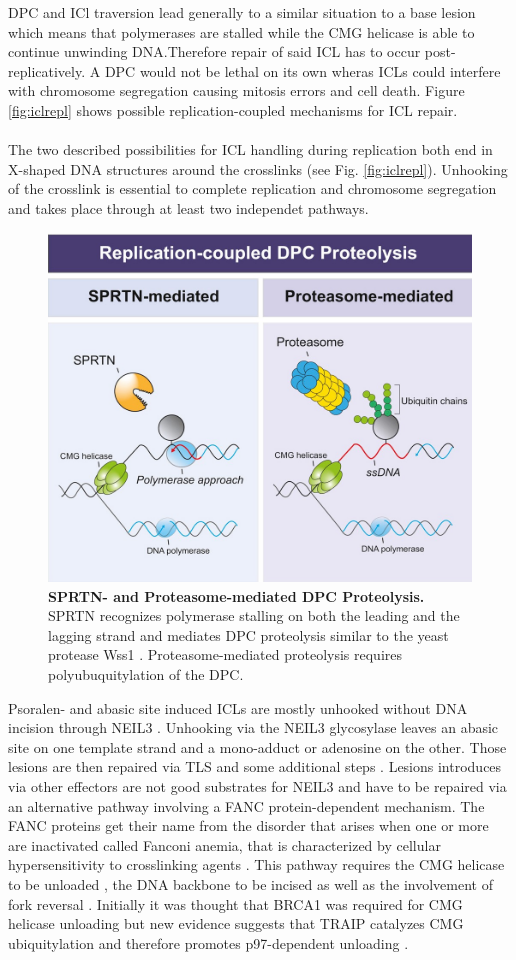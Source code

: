 DPC and ICl traversion lead generally to a similar situation to a base lesion which means that polymerases are stalled while the CMG helicase is able to continue unwinding DNA.Therefore repair of said ICL has to occur post-replicatively.  A DPC would not be lethal on its own wheras ICLs could interfere with chromosome segregation causing mitosis errors and cell death. Figure \ref{fig:iclrepl} shows possible replication-coupled mechanisms for ICL repair.\\\\
The two described possibilities for ICL handling during replication both end in X-shaped DNA structures around the crosslinks (see Fig. \ref{fig:iclrepl}). Unhooking of the crosslink is essential to complete replication and chromosome segregation and takes place through at least two independet pathways.\\
\begin{figure}[H]
\centering
    \includegraphics[width=.68\textwidth]{resources/images/Intro/sprtn.jpg}
    \caption[SPRTN- and Proteasome-mediated DPC Proteolysis]{\textbf{SPRTN- and Proteasome-mediated DPC Proteolysis.} SPRTN recognizes polymerase stalling on both the leading and the lagging strand and mediates DPC proteolysis similar to the yeast protease Wss1 \citep{Stingele.2015}. Proteasome-mediated proteolysis requires polyubuquitylation of the DPC.\\ \citep{Larsen.2019}}
    \label{fig:sprtn_action}
\end{figure}
Psoralen- and abasic site induced ICLs are mostly unhooked without DNA incision through NEIL3 \citep{Semlow.2016}. Unhooking via the NEIL3 glycosylase leaves an abasic site on one template strand and a mono-adduct or adenosine on the other. Those lesions are then repaired via TLS and some additional steps \citep{Raschle.2015}. Lesions introduces via other effectors are not good substrates for NEIL3 and have to be repaired via an alternative pathway involving a FANC protein-dependent mechanism. The FANC proteins get their name from the disorder that arises when one or more are inactivated called Fanconi anemia, that is characterized by cellular hypersensitivity to crosslinking agents \citep{Ceccaldi.2016}. This pathway requires the CMG helicase to be unloaded , the DNA backbone to be incised as well as the involvement of fork reversal \citep{Amunugama.2018}. Initially it was thought that BRCA1 was required for CMG helicase unloading but new evidence suggests that TRAIP catalyzes CMG ubiquitylation and therefore promotes p97-dependent unloading \cite{Wu.2019}.\\
